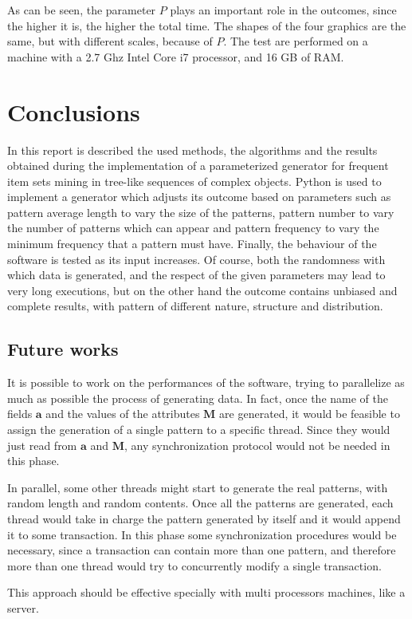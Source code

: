 \documentclass{acm_proc_article-sp-sigmod09}
\begin{document}
As can be seen, the parameter $P$ plays an important role in the outcomes, since the higher it is, the higher the total time. The shapes of the four graphics are the same, but with different scales, because of $P$. The test are performed on a machine with a 2.7 Ghz Intel Core i7 processor, and 16 GB of RAM.

\section{Conclusions}
In this report is described the used methods, the algorithms and the results obtained during the implementation of a parameterized generator for frequent item sets mining in tree-like sequences of complex objects. Python is used to implement a generator which adjusts its outcome based on parameters such as pattern average length to vary the size of the patterns, pattern number to vary the number of patterns which can appear and pattern frequency to vary the minimum frequency that a pattern must have. Finally, the behaviour of the software is tested as its input increases. Of course, both the randomness with which data is generated, and the respect of the given parameters may lead to very long executions, but on the other hand the outcome contains unbiased and complete results, with pattern of different nature, structure and distribution.

\subsection{Future works}
It is possible to work on the performances of the software, trying to parallelize as much as possible the process of generating data. In fact, once the name of the fields $\boldsymbol{a}$ and the values of the attributes $\boldsymbol{M}$ are generated, it would be feasible to assign the generation of a single pattern to a specific thread. Since they would just read from $\boldsymbol{a}$ and $\boldsymbol{M}$, any synchronization protocol would not be needed in this phase.

In parallel, some other threads might start to generate the real patterns, with random length and random contents. Once all the patterns are generated, each thread would take in charge the pattern generated by itself and it would append it to some transaction. In this phase some synchronization procedures would be necessary, since a transaction can contain more than one pattern, and therefore more than one thread would try to concurrently modify a single transaction.

This approach should be effective specially with multi processors machines, like a server.



\end{document}
